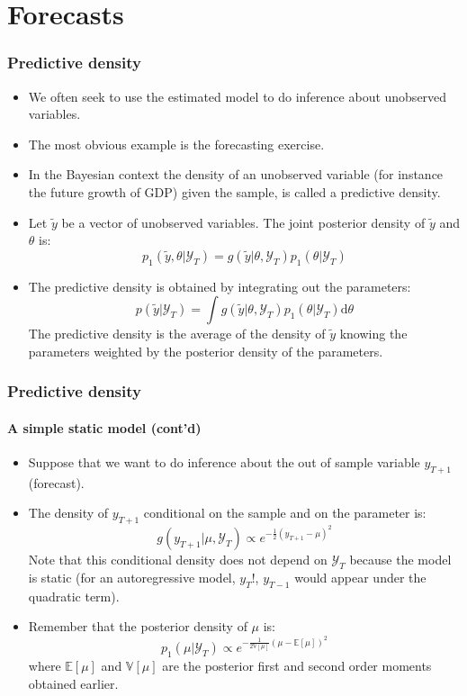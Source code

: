 \documentclass[10pt,slidestop]{beamer}
\newcommand{\AllSample}{ \mathcal Y_T }
\begin{document}
\section{Forecasts}

\begin{frame}
  \frametitle{Predictive density}
  \begin{itemize}
  \item We often seek to use the estimated model to do inference about
    unobserved variables.
  \item The most obvious example is the forecasting exercise.
  \item In the Bayesian context the density of an unobserved variable
    (for instance the future growth of GDP) given the sample, is
    called a predictive density.
  \item Let $\tilde{y}$ be a vector of unobserved variables. The joint
    posterior density of $\tilde{y}$ and $\theta$ is:
    \[
    p_1(\tilde{y},\theta|\AllSample) =g(\tilde{y}|\theta,\AllSample)p_1(\theta|\AllSample)
    \]
  \item The predictive density is obtained by integrating out the
    parameters:
    \[
    p(\tilde{y}|\AllSample) = \int
    g(\tilde{y}|\theta,\AllSample)p_1(\theta|\AllSample)\mathrm d\theta
    \]
    The predictive density is the average of the density of
    $\tilde{y}$ knowing the parameters weighted by the posterior
    density of the parameters.
  \end{itemize}
\end{frame}


\begin{frame}
  \frametitle{Predictive density}
  \framesubtitle{A simple static model (cont'd)}
  \begin{itemize}
  \item Suppose that we want to do inference about the out of sample
    variable $y_{T+1}$ (forecast).
    \bigskip
  \item The density of $y_{T+1}$ conditional on the sample and on the
    parameter is:
    \[
    g(y_{T+1}|\mu,\AllSample) \propto e^{-\frac{1}{2}(y_{T+1}-\mu)^2}
    \]
    Note that this conditional density does not depend on $\AllSample$ because the
    model is static (for an autoregressive model, $y_T$!, $y_{T-1}$
    would appear under the quadratic term).
    \bigskip
  \item Remember that the posterior density of $\mu$ is:
    \[
    p_1(\mu|\AllSample) \propto e^{-\frac{1}{2\mathbb
        V[\mu]}(\mu-\mathbb E[\mu])^2}
    \]
    where $\mathbb E[\mu]$ and $\mathbb V[\mu]$ are the posterior first
    and second order moments obtained earlier.
  \end{itemize}
\end{frame}
\end{document}
